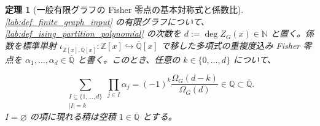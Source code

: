 \documentclass[11pt,a4paper]{article}
\newtheorem{theorem}[definition]{定理}
\theoremstyle{remark}
\begin{document}
\begin{theorem}[一般有限グラフの Fisher 零点の基本対称式と係数比]\label{lab:theorem_fisher_zero_elementary_symmetric_coefficient_ratio}
\cref{lab:def_finite_graph_input}
 の有限グラフについて、
\cref{lab:def_ising_partition_polynomial}
 の次数を 
$d:=\deg Z_G(x)\in\mathbb N$
 と置く。係数を標準単射 
$\iota_{\mathbb Z[x],\overline{\mathbb Q}[x]}:\mathbb Z[x]\hookrightarrow\overline{\mathbb Q}[x]$
 で移した多項式の重複度込み Fisher 零点を 
$\alpha_1,\ldots,\alpha_d\in\overline{\mathbb Q}$
 と書く。このとき、任意の 
$k\in\{0,\ldots,d\}$
 について、

\[\sum_{\substack{I\subseteq\{1,\ldots,d\}\\|I|=k}}
\prod_{j\in I}\alpha_j
=
(-1)^k\frac{\Omega_G(d-k)}{\Omega_G(d)}
\in\mathbb Q
\subset\overline{\mathbb Q}.\]
$I=\varnothing$
 の項に現れる積は空積 
$1\in\overline{\mathbb Q}$
 とする。

\end{theorem}
\end{document}
